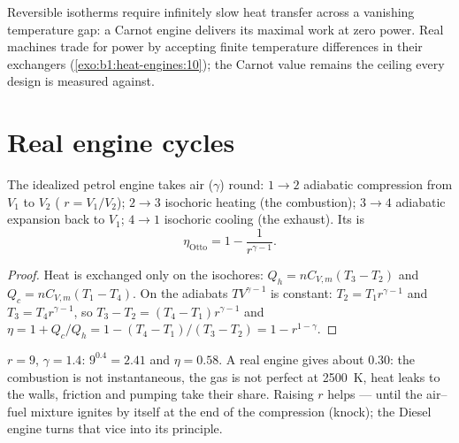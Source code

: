 \begin{remark}\label{rem:b1:heat-engines:notengine}
Reversible isotherms require infinitely slow heat transfer across a
vanishing temperature gap: a Carnot engine delivers its maximal work
at zero power. Real machines trade  for power by accepting
finite temperature differences in their exchangers
(\cref{exo:b1:heat-engines:10}); the Carnot value remains the ceiling
every design is measured against.
\end{remark}

\section{Real engine cycles}

\begin{proposition}\label{prop:b1:heat-engines:otto}
The idealized petrol engine takes air ($\gamma$) round: $1 \to 2$
adiabatic compression from $V_1$ to $V_2$ (\emph{}
$r = V_1/V_2$); $2 \to 3$ isochoric heating (the combustion); $3 \to 4$
adiabatic expansion back to $V_1$; $4 \to 1$ isochoric cooling (the
exhaust). Its  is
\[
\eta_{\text{Otto}} = 1 - \frac{1}{r^{\gamma-1}} .
\]
\end{proposition}

\begin{proof}
Heat is exchanged only on the isochores: $Q_h = nC_{V,m}(T_3 - T_2)$ and
$Q_c = nC_{V,m}(T_1 - T_4)$. On the adiabats $TV^{\gamma-1}$ is constant:
$T_2 = T_1r^{\gamma-1}$ and $T_3 = T_4r^{\gamma-1}$, so $T_3 - T_2 =
(T_4 - T_1)r^{\gamma-1}$ and
$\eta = 1 + Q_c/Q_h = 1 - (T_4 - T_1)/(T_3 - T_2) = 1 - r^{1-\gamma}$.
\end{proof}

\begin{example}\label{ex:b1:heat-engines:ottonumbers}
$r = 9$, $\gamma = 1.4$: $9^{0.4} = 2.41$ and $\eta = 0.58$. A real engine
gives about $0.30$: the combustion is not instantaneous, the gas is not
perfect at \qty{2500}{K}, heat leaks to the walls, friction and pumping
take their share. Raising $r$ helps --- until the air--fuel mixture
ignites by itself at the end of the compression (knock); the Diesel
engine turns that vice into its principle.
\end{example}

